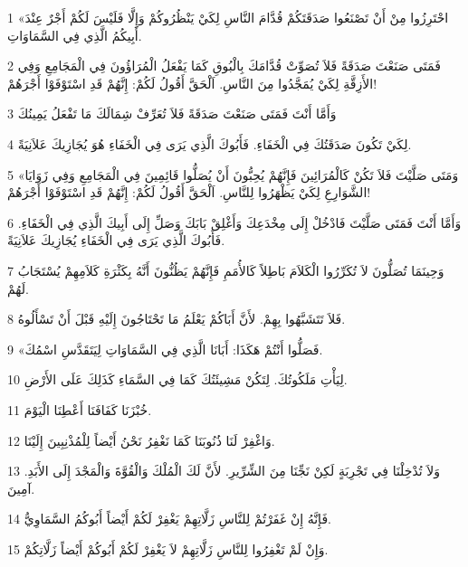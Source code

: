 \par 1 «احْتَرِزُوا مِنْ أَنْ تَصْنَعُوا صَدَقَتَكُمْ قُدَّامَ النَّاسِ لِكَيْ يَنْظُرُوكُمْ وَإِلَّا فَلَيْسَ لَكُمْ أَجْرٌ عِنْدَ أَبِيكُمُ الَّذِي فِي السَّمَاوَاتِ.
\par 2 فَمَتَى صَنَعْتَ صَدَقَةً فَلاَ تُصَوِّتْ قُدَّامَكَ بِالْبُوقِ كَمَا يَفْعَلُ الْمُرَاؤُونَ فِي الْمَجَامِعِ وَفِي الأَزِقَّةِ لِكَيْ يُمَجَّدُوا مِنَ النَّاسِ. اَلْحَقَّ أَقُولُ لَكُمْ: إِنَّهُمْ قَدِ اسْتَوْفَوْا أَجْرَهُمْ!
\par 3 وَأَمَّا أَنْتَ فَمَتَى صَنَعْتَ صَدَقَةً فَلاَ تُعَرِّفْ شِمَالَكَ مَا تَفْعَلُ يَمِينُكَ
\par 4 لِكَيْ تَكُونَ صَدَقَتُكَ فِي الْخَفَاءِ. فَأَبُوكَ الَّذِي يَرَى فِي الْخَفَاءِ هُوَ يُجَازِيكَ عَلاَنِيَةً.
\par 5 «وَمَتَى صَلَّيْتَ فَلاَ تَكُنْ كَالْمُرَائِينَ فَإِنَّهُمْ يُحِبُّونَ أَنْ يُصَلُّوا قَائِمِينَ فِي الْمَجَامِعِ وَفِي زَوَايَا الشَّوَارِعِ لِكَيْ يَظْهَرُوا لِلنَّاسِ. اَلْحَقَّ أَقُولُ لَكُمْ: إِنَّهُمْ قَدِ اسْتَوْفَوْا أَجْرَهُمْ!
\par 6 وَأَمَّا أَنْتَ فَمَتَى صَلَّيْتَ فَادْخُلْ إِلَى مِخْدَعِكَ وَأَغْلِقْ بَابَكَ وَصَلِّ إِلَى أَبِيكَ الَّذِي فِي الْخَفَاءِ. فَأَبُوكَ الَّذِي يَرَى فِي الْخَفَاءِ يُجَازِيكَ عَلاَنِيَةً.
\par 7 وَحِينَمَا تُصَلُّونَ لاَ تُكَرِّرُوا الْكَلاَمَ بَاطِلاً كَالأُمَمِ فَإِنَّهُمْ يَظُنُّونَ أَنَّهُ بِكَثْرَةِ كَلاَمِهِمْ يُسْتَجَابُ لَهُمْ.
\par 8 فَلاَ تَتَشَبَّهُوا بِهِمْ. لأَنَّ أَبَاكُمْ يَعْلَمُ مَا تَحْتَاجُونَ إِلَيْهِ قَبْلَ أَنْ تَسْأَلُوهُ.
\par 9 «فَصَلُّوا أَنْتُمْ هَكَذَا: أَبَانَا الَّذِي فِي السَّمَاوَاتِ لِيَتَقَدَّسِ اسْمُكَ.
\par 10 لِيَأْتِ مَلَكُوتُكَ. لِتَكُنْ مَشِيئَتُكَ كَمَا فِي السَّمَاءِ كَذَلِكَ عَلَى الأَرْضِ.
\par 11 خُبْزَنَا كَفَافَنَا أَعْطِنَا الْيَوْمَ.
\par 12 وَاغْفِرْ لَنَا ذُنُوبَنَا كَمَا نَغْفِرُ نَحْنُ أَيْضاً لِلْمُذْنِبِينَ إِلَيْنَا.
\par 13 وَلاَ تُدْخِلْنَا فِي تَجْرِبَةٍ لَكِنْ نَجِّنَا مِنَ الشِّرِّيرِ. لأَنَّ لَكَ الْمُلْكَ وَالْقُوَّةَ وَالْمَجْدَ إِلَى الأَبَدِ. آمِينَ.
\par 14 فَإِنَّهُ إِنْ غَفَرْتُمْ لِلنَّاسِ زَلَّاتِهِمْ يَغْفِرْ لَكُمْ أَيْضاً أَبُوكُمُ السَّمَاوِيُّ.
\par 15 وَإِنْ لَمْ تَغْفِرُوا لِلنَّاسِ زَلَّاتِهِمْ لاَ يَغْفِرْ لَكُمْ أَبُوكُمْ أَيْضاً زَلَّاتِكُمْ.
